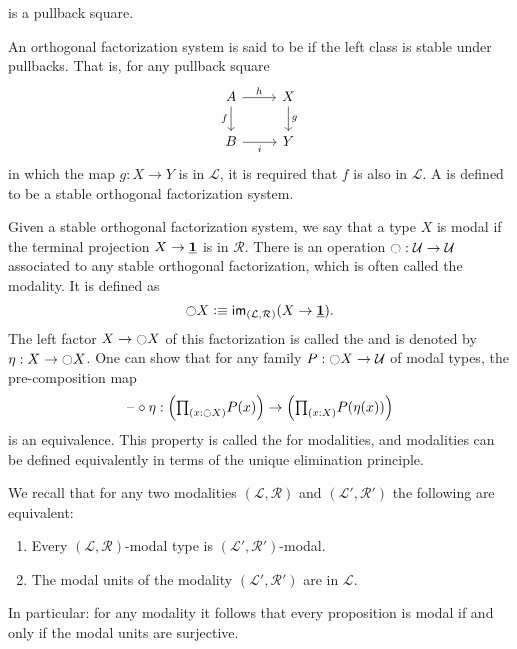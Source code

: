 \documentclass[9pt,twosided]{amsart}
\begin{document}
\begin{defn}
\begin{enumerate}
\begin{equation*}
    \end{equation*}
    is a pullback square.
  \end{enumerate}
  An orthogonal factorization system is said to be  if the left class is stable under pullbacks. That is, for any pullback square
    \begin{equation*}
      \begin{tikzcd}
        A \arrow[r,"h"] \arrow[d,swap,"f"] & X \arrow[d,"g"] \\
        B \arrow[r,swap,"i"] & Y
      \end{tikzcd}
    \end{equation*}
    in which the map $g:X \to Y$ is in $\mathcal{L}$, it is required that $f$ is also in $\mathcal{L}$. A  is defined to be a stable orthogonal factorization system.
\end{defn}

Given a stable orthogonal factorization system, we say that a type $X$ is modal if the terminal projection $X\to \underline{\mathbf{1}}$ is in $\mathcal{R}$. 
There is an operation ${\ocircle}:\mathcal{U}\to\mathcal{U}$ associated to any stable orthogonal factorization, which is often called the modality. It is defined as
\begin{equation*}
{\ensuremath{\ocircle}} X \vcentcolon\equiv \mathsf{im}_{(\mathcal{L},\mathcal{R})}(X\to \underline{\mathbf{1}}).
\end{equation*}
The left factor $X \to {\ensuremath{\ocircle}} X$ of this factorization is called the  and is denoted by $\eta:X\to {\ensuremath{\ocircle}} X$. One can show that for any family $P:{\ocircle} X \to \mathcal{U}$ of modal types, the pre-composition map
\begin{equation*}
\blank\circ \eta : \Big(\prd{x:\modal X}P(x)\Big)\to \Big(\prd{x:X}P(\eta(x))\Big)
\end{equation*}
is an equivalence. This property is called the  for modalities, and modalities can be defined equivalently in terms of the unique elimination principle.

We recall that for any two modalities $(\mathcal{L},\mathcal{R})$ and $(\mathcal{L}',\mathcal{R}')$ the following are equivalent:
\begin{enumerate}
\item Every $(\mathcal{L},\mathcal{R})$-modal type is $(\mathcal{L}',\mathcal{R}')$-modal.
\item The modal units of the modality $(\mathcal{L}',\mathcal{R}')$ are in $\mathcal{L}$.
\end{enumerate}
In particular: for any modality it follows that every proposition is modal if and only if the modal units are surjective.
\end{document}
